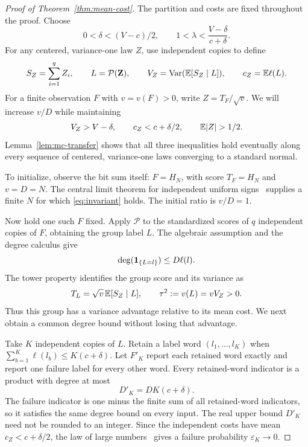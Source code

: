 \begin{proof}[Proof of Theorem~\ref{thm:mean-cost}]
The partition and costs are fixed throughout the proof.  Choose
\[
 0<\delta<(V-c)/2,
 \qquad 1<\lambda<\frac{V-\delta}{c+\delta}.
\]
For any centered, variance-one law $Z$, use independent copies to
define
\[
 S_Z=\sum_{i=1}^q Z_i,\qquad L=\mathcal P(\mathbf Z),\qquad
 V_Z=\operatorname{Var}(\mathbb E[S_Z\mid L]),\qquad c_Z=\mathbb E\ell(L).
\]
For a finite observation $F$ with $v=v(F)>0$, write $Z=T_F/\sqrt v$.
We will increase $v/D$ while maintaining
\begin{equation}\label{eq:invariant}
 V_Z>V-\delta,\qquad c_Z<c+\delta/2,\qquad \E|Z|>1/2.
\end{equation}
Lemma~\ref{lem:mc-transfer} shows that all three inequalities hold
eventually along every sequence of centered, variance-one laws
converging to a standard normal.

To initialize, observe the bit sum itself: $F=H_N$, with score
$T_F=H_N$ and $v=D=N$.  The central limit theorem for independent
uniform signs~\cite[Theorem~3.4.1]{Durrett} supplies a finite $N$ for which
\eqref{eq:invariant} holds.  The initial ratio is $v/D=1$.

Now hold one such $F$ fixed.  Apply $\mathcal P$ to the standardized
scores of $q$ independent copies of $F$, obtaining the group label $L$.
The algebraic assumption and the degree calculus give
\[
 \deg(\mathbf 1_{\{L=l\}})\le D\ell(l).
\]
The tower property identifies the group score and its variance as
\begin{equation}\label{eq:group}
 T_L=\sqrt v\,\mathbb E[S_Z\mid L],\qquad
 \tau^2:=v(L)=vV_Z>0.
\end{equation}
Thus this group has a variance advantage relative to its mean cost.
We next obtain a common degree bound without losing that advantage.

Take $K$ independent copies of $L$.  Retain a label word
$(l_1,\ldots,l_K)$ when $\sum_{b=1}^K\ell(l_b)\le K(c+\delta)$.
Let $F'_K$ report each retained word exactly and report one failure
label for every other word.  Every retained-word indicator is a product
with degree at most
\begin{equation}\label{eq:degree}
 D'_K=DK(c+\delta).
\end{equation}
The failure indicator is one minus the finite sum of all retained-word
indicators, so it satisfies the same degree bound on every input.
The real upper bound $D'_K$ need not be rounded to an integer.
Since the independent costs have mean $c_Z<c+\delta/2$, the law of
large numbers~\cite[Theorem~2.2.3]{Durrett} gives a failure probability
$\varepsilon_K\to0$.


\end{proof}
